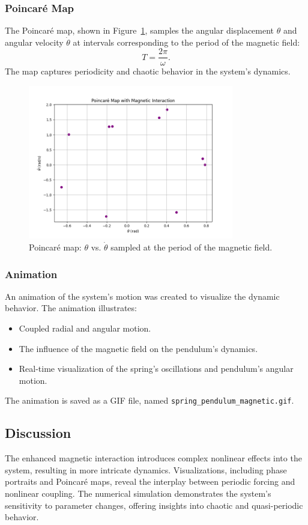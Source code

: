 \documentclass[12pt]{article}
\begin{document}
\subsubsection{Poincaré Map}
The Poincaré map, shown in Figure~\ref{fig:poincare_map_magnetic}, samples the angular displacement \( \theta \) and angular velocity \( \dot{\theta} \) at intervals corresponding to the period of the magnetic field:
\[
T = \frac{2\pi}{\omega}.
\]
The map captures periodicity and chaotic behavior in the system's dynamics.

\begin{figure}[h!]
    \centering
    \includegraphics[width=0.8\textwidth]{poincare_map_magnetic.png}
    \caption{Poincaré map: \( \theta \) vs. \( \dot{\theta} \) sampled at the period of the magnetic field.}
    \label{fig:poincare_map_magnetic}
\end{figure}

\subsubsection{Animation}
An animation of the system's motion was created to visualize the dynamic behavior. The animation illustrates:
\begin{itemize}
    \item Coupled radial and angular motion.
    \item The influence of the magnetic field on the pendulum's dynamics.
    \item Real-time visualization of the spring's oscillations and pendulum's angular motion.
\end{itemize}
The animation is saved as a GIF file, named \texttt{spring\_pendulum\_magnetic.gif}.

\subsection{Discussion}
The enhanced magnetic interaction introduces complex nonlinear effects into the system, resulting in more intricate dynamics. Visualizations, including phase portraits and Poincaré maps, reveal the interplay between periodic forcing and nonlinear coupling. The numerical simulation demonstrates the system's sensitivity to parameter changes, offering insights into chaotic and quasi-periodic behavior.
\end{document}
